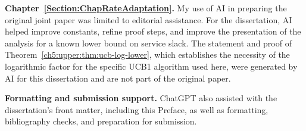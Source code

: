 \noindent\textbf{Chapter~\ref{Section:ChapRateAdaptation}.}
My use of AI in preparing the original joint paper was limited to
editorial assistance. For the dissertation, AI helped improve constants,
refine proof steps, and improve the presentation of the analysis for a
known lower bound on service slack. The statement and proof of
Theorem~\ref{ch5:upper:thm:ucb-log-lower}, which establishes the necessity
of the logarithmic factor for the specific UCB1 algorithm used here, were
generated by AI for this dissertation and are not part of the original paper.

\noindent\textbf{Formatting and submission support.}
ChatGPT also assisted with the dissertation's front matter, including
this Preface, as well as formatting, bibliography checks, and preparation
for submission.
